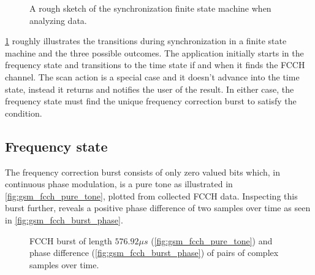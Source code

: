 \begin{figure}[H]
  \centering
  \caption{A rough sketch of the synchronization finite state
    machine when analyzing data.}
  \label{fig:ssm}
\end{figure}

\cref{fig:ssm} roughly illustrates the transitions during
synchronization in a finite state machine and the three possible
outcomes. The application initially starts in the frequency state and
transitions to the time state if and when it finds the \gls{FCCH}
channel. The scan action is a special case and it doesn't advance into
the time state, instead it returns and notifies the user of the
result. In either case, the frequency state must find the unique
frequency correction burst to satisfy the condition.

\subsection{Frequency state}
\label{sec:freq_state}
The frequency correction burst consists of only zero valued bits
which, in continuous phase modulation, is a pure tone as illustrated
in \cref{fig:gsm_fcch_pure_tone}, plotted from collected \gls{FCCH}
data. Inspecting this burst further, reveals a positive phase
difference of two samples over time as seen in
\cref{fig:gsm_fcch_burst_phase}.

\begin{figure}[H]
  \centering
   \quad
  \caption{FCCH burst of length $576.92\mu s$
    (\ref{fig:gsm_fcch_pure_tone}) and phase difference
    (\ref{fig:gsm_fcch_burst_phase}) of pairs of complex samples over
    time.}
\end{figure}

